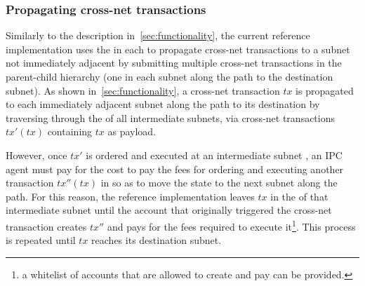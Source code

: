   

\subsubsection{Propagating cross-net transactions}
\label{sec:cnetrefimpl} 
Similarly to the description in~\cref{sec:functionality}, the current reference implementation uses the \postoffice in each \gw to propagate cross-net transactions to a subnet not immediately adjacent by submitting multiple cross-net transactions in the parent-child hierarchy (one in each subnet along the path to the destination subnet). As shown in~\cref{sec:functionality}, a cross-net transaction $tx$ is propagated to each immediately adjacent subnet along the path to its destination by traversing through the \postoffice of all intermediate subnets, via cross-net transactions $tx'(tx)$ containing $tx$ as payload. 

However, once $tx'$ is ordered and executed at an intermediate subnet , an IPC agent must pay for the cost to pay the fees for ordering and executing another transaction $tx''(tx)$ in  so as to move the state to the next subnet along the path. For this reason, the reference implementation leaves $tx$ in the \postoffice of that intermediate subnet until the account that originally triggered the cross-net transaction creates $tx''$ and pays for the fees required to execute it\footnote{a whitelist of accounts that are allowed to create and pay can be provided.}. This process is repeated until $tx$ reaches its destination subnet.

